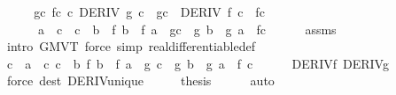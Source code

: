\begin{isabellebody}
%
\isadelimproof
%
\endisadelimproof
%
\isatagproof
{}\isamarkupfalse%
\ {\isacharminus}{\kern0pt}\isanewline
\ \ \isamarkupfalse%
\ {\isachardoublequoteopen}{\isasymexists}g{\isacharprime}{\kern0pt}c\ f{\isacharprime}{\kern0pt}c\ c{\isachardot}{\kern0pt}\ DERIV\ g\ c\ {\isacharcolon}{\kern0pt}{\isachargreater}{\kern0pt}\ g{\isacharprime}{\kern0pt}c\ {\isasymand}\ DERIV\ f\ c\ {\isacharcolon}{\kern0pt}{\isachargreater}{\kern0pt}\ f{\isacharprime}{\kern0pt}c\ {\isasymand}\isanewline
\ \ \ \ \ \ a\ {\isacharless}{\kern0pt}\ c\ {\isasymand}\ c\ {\isacharless}{\kern0pt}\ b\ {\isasymand}\ {\isacharparenleft}{\kern0pt}f\ b\ {\isacharminus}{\kern0pt}\ f\ a{\isacharparenright}{\kern0pt}\ {\isacharasterisk}{\kern0pt}\ g{\isacharprime}{\kern0pt}c\ {\isacharequal}{\kern0pt}\ {\isacharparenleft}{\kern0pt}g\ b\ {\isacharminus}{\kern0pt}\ g\ a{\isacharparenright}{\kern0pt}\ {\isacharasterisk}{\kern0pt}\ f{\isacharprime}{\kern0pt}c{\isachardoublequoteclose}\isanewline
\ \ \ \ \isamarkupfalse%
\ assms\ \isamarkupfalse%
\ {\isacharparenleft}{\kern0pt}intro\ GMVT{\isacharparenright}{\kern0pt}\ {\isacharparenleft}{\kern0pt}force\ simp{\isacharcolon}{\kern0pt}\ real{\isacharunderscore}{\kern0pt}differentiable{\isacharunderscore}{\kern0pt}def{\isacharparenright}{\kern0pt}{\isacharplus}{\kern0pt}\isanewline
\ \ \isamarkupfalse%
\ \isamarkupfalse%
\ c\ \ {\isachardoublequoteopen}a\ {\isacharless}{\kern0pt}\ c{\isachardoublequoteclose}\ {\isachardoublequoteopen}c\ {\isacharless}{\kern0pt}\ b{\isachardoublequoteclose}\ {\isachardoublequoteopen}{\isacharparenleft}{\kern0pt}f\ b\ {\isacharminus}{\kern0pt}\ f\ a{\isacharparenright}{\kern0pt}\ {\isacharasterisk}{\kern0pt}\ g{\isacharprime}{\kern0pt}\ c\ {\isacharequal}{\kern0pt}\ {\isacharparenleft}{\kern0pt}g\ b\ {\isacharminus}{\kern0pt}\ g\ a{\isacharparenright}{\kern0pt}\ {\isacharasterisk}{\kern0pt}\ f{\isacharprime}{\kern0pt}\ c{\isachardoublequoteclose}\isanewline
\ \ \ \ \isamarkupfalse%
\ DERIV{\isacharunderscore}{\kern0pt}f\ DERIV{\isacharunderscore}{\kern0pt}g\ \isamarkupfalse%
\ {\isacharparenleft}{\kern0pt}force\ dest{\isacharcolon}{\kern0pt}\ DERIV{\isacharunderscore}{\kern0pt}unique{\isacharparenright}{\kern0pt}\isanewline
\ \ \isamarkupfalse%
\ \isamarkupfalse%
\ {\isacharquery}{\kern0pt}thesis\isanewline
\ \ \ \ \isamarkupfalse%
\ auto\isanewline
{}\isamarkupfalse%
%
\endisatagproof
{\isafoldproof}%
%
\isadelimproof

\end{isabellebody}
